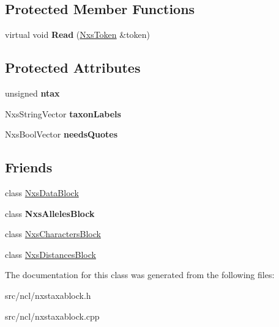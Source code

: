 \subsection*{Protected Member Functions}
\begin{DoxyCompactItemize}
\item 
\hypertarget{classNxsTaxaBlock_ad2f6ed5bca65a4f13297b96f5ce2c103}{
virtual void {\bfseries Read} (\hyperlink{classNxsToken}{NxsToken} \&token)}
\label{classNxsTaxaBlock_ad2f6ed5bca65a4f13297b96f5ce2c103}

\end{DoxyCompactItemize}
\subsection*{Protected Attributes}
\begin{DoxyCompactItemize}
\item 
\hypertarget{classNxsTaxaBlock_abd5df0c58e31ddfa79d1590684708323}{
unsigned {\bfseries ntax}}
\label{classNxsTaxaBlock_abd5df0c58e31ddfa79d1590684708323}

\item 
\hypertarget{classNxsTaxaBlock_ad60b4588aa924cf2a99b4101d0477adc}{
NxsStringVector {\bfseries taxonLabels}}
\label{classNxsTaxaBlock_ad60b4588aa924cf2a99b4101d0477adc}

\item 
\hypertarget{classNxsTaxaBlock_ae69aaf354301e536f5b9524dc5e3f3de}{
NxsBoolVector {\bfseries needsQuotes}}
\label{classNxsTaxaBlock_ae69aaf354301e536f5b9524dc5e3f3de}

\end{DoxyCompactItemize}
\subsection*{Friends}
\begin{DoxyCompactItemize}
\item 
\hypertarget{classNxsTaxaBlock_a69ad16654c829e898a92c569c7fa8b8d}{
class \hyperlink{classNxsTaxaBlock_a69ad16654c829e898a92c569c7fa8b8d}{NxsDataBlock}}
\label{classNxsTaxaBlock_a69ad16654c829e898a92c569c7fa8b8d}

\item 
\hypertarget{classNxsTaxaBlock_ad9ba2bb6bba16b181df5d60f0c244681}{
class {\bfseries NxsAllelesBlock}}
\label{classNxsTaxaBlock_ad9ba2bb6bba16b181df5d60f0c244681}

\item 
\hypertarget{classNxsTaxaBlock_ab9466d1b21f90b6fd961284f19c6e9d4}{
class \hyperlink{classNxsTaxaBlock_ab9466d1b21f90b6fd961284f19c6e9d4}{NxsCharactersBlock}}
\label{classNxsTaxaBlock_ab9466d1b21f90b6fd961284f19c6e9d4}

\item 
\hypertarget{classNxsTaxaBlock_aa46e2fbd4a6264cf2f0f91035cdf6188}{
class \hyperlink{classNxsTaxaBlock_aa46e2fbd4a6264cf2f0f91035cdf6188}{NxsDistancesBlock}}
\label{classNxsTaxaBlock_aa46e2fbd4a6264cf2f0f91035cdf6188}

\end{DoxyCompactItemize}


The documentation for this class was generated from the following files:\begin{DoxyCompactItemize}
\item 
src/ncl/nxstaxablock.h\item 
src/ncl/nxstaxablock.cpp\end{DoxyCompactItemize}
